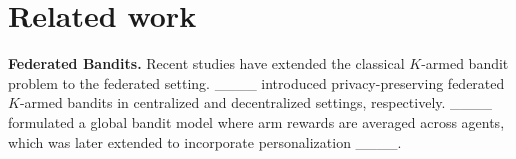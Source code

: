 \section{Related work}
\vspace{-1.5mm}
\textbf{Federated Bandits.}
Recent studies have extended the classical $K$-armed bandit problem to the federated setting. 
____ introduced privacy-preserving federated $K$-armed bandits in centralized and decentralized settings, respectively. ____ formulated a global bandit model where arm rewards are averaged across agents, which was later extended to incorporate personalization ____. 
